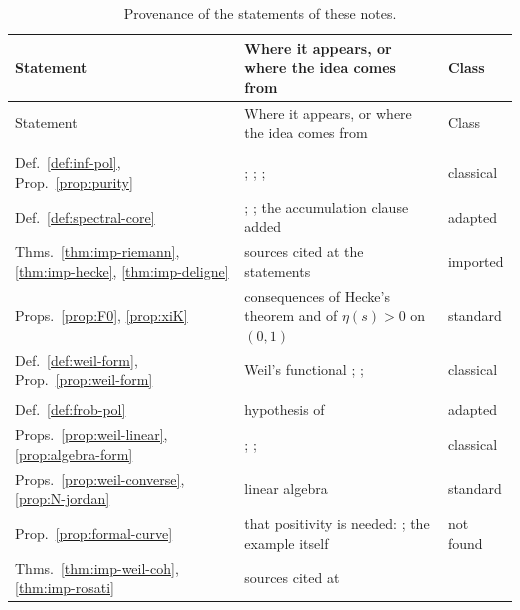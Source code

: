 \documentclass[11pt]{amsart}
\theoremstyle{plain}
\theoremstyle{definition}
\theoremstyle{remark}
\numberwithin{equation}{section}
\begin{document}
{\small
\begin{longtable}{@{}>{\raggedright\arraybackslash}p{}
>{\raggedright\arraybackslash}p{}
>{\raggedright\arraybackslash}p{}@{}}
\caption{Provenance of the statements of these notes.}
\label{tab:provenance}\\
\toprule
Statement & Where it appears, or where the idea comes from & Class\\
\midrule
\endfirsthead
\toprule
Statement & Where it appears, or where the idea comes from & Class\\
\midrule
\endhead
\bottomrule
\endfoot
\multicolumn{3}{@{}l}{\emph{Section~\ref{sec:conventions}}}\\
Def.~\ref{def:inf-pol}, Prop.~\ref{prop:purity} &
\cite[pp.~392--393]{Serre1960Analogues};
\cite[(7.11)--(7.13), pp.~32--33]{Deninger1994Motivic};
\cite[p.~169]{Deninger1998Analogies}; \cite[2.7, p.~3]{Deninger2022NoWeil}
& classical\\
Def.~\ref{def:spectral-core} &
\cite[Definition~2.1(i), p.~521]{FlachMorin2020DeningerWeilArakelov};
\cite[\S1]{Deninger1994Motivic}; the accumulation clause added &
adapted\\
Thms.~\ref{thm:imp-riemann}, \ref{thm:imp-hecke},
\ref{thm:imp-deligne} & sources cited at the statements & imported\\
Props.~\ref{prop:F0}, \ref{prop:xiK} & consequences of Hecke's theorem
and of $\eta(s)>0$ on $(0,1)$ & standard\\
Def.~\ref{def:weil-form}, Prop.~\ref{prop:weil-form} & Weil's
functional \cite[\S16]{Weil1972Explicit};
\cite[\S V, p.~9]{Bombieri2000Clay};
\cite[Theorem~1, p.~191]{Bombieri2000Lincei} & classical\\
\multicolumn{3}{@{}l}{\emph{Section~\ref{sec:finite-field}}}\\
Def.~\ref{def:frob-pol} & hypothesis of
\cite[Th\'eor\`eme~1]{Serre1960Analogues} & adapted\\
Props.~\ref{prop:weil-linear}, \ref{prop:algebra-form} &
\cite[p.~393]{Serre1960Analogues};
\cite[Lemma~4.6, p.~385]{Kleiman1968Cycles};
\cite[Proposition~3.10]{Milne2016RHFF} & classical\\
Props.~\ref{prop:weil-converse}, \ref{prop:N-jordan} & linear algebra
& standard\\
Prop.~\ref{prop:formal-curve} & that positivity is needed:
\cite[p.~360]{Kleiman1968Cycles}; the example itself & not found\\
Thms.~\ref{thm:imp-weil-coh}, \ref{thm:imp-rosati} & sources cited at

\end{longtable}}
\end{document}
